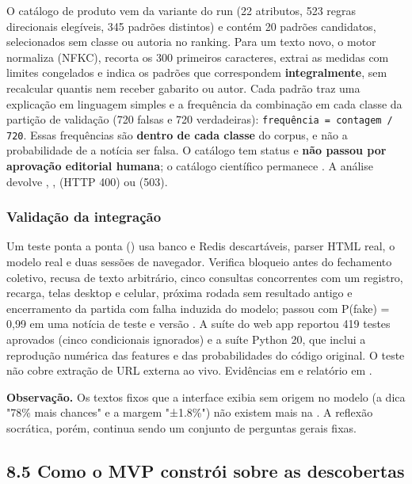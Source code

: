 \documentclass[
  brazilian,
  11pt,
]{article}
\begin{document}
O catálogo de produto vem da variante  do run  (22 atributos, 523 regras direcionais elegíveis, 345 padrões distintos) e contém 20 padrões candidatos, selecionados sem classe ou autoria no ranking. Para um texto novo, o motor normaliza (NFKC), recorta os 300 primeiros caracteres, extrai as medidas com limites congelados e indica os padrões que correspondem \textbf{integralmente}, sem recalcular quantis nem receber gabarito ou autor. Cada padrão traz uma explicação em linguagem simples e a frequência da combinação em cada classe da partição de validação (720 falsas e 720 verdadeiras): \texttt{frequência = contagem / 720}. Essas frequências são \textbf{dentro de cada classe} do corpus, e não a probabilidade de a notícia ser falsa. O catálogo tem status  e \textbf{não passou por aprovação editorial humana}; o catálogo científico permanece . A análise devolve , ,  (HTTP 400) ou  (503).

\subsubsection{Validação da integração}

Um teste ponta a ponta () usa banco e Redis descartáveis, parser HTML real, o modelo real e duas sessões de navegador. Verifica bloqueio antes do fechamento coletivo, recusa de texto arbitrário, cinco consultas concorrentes com um registro, recarga, telas desktop e celular, próxima rodada sem resultado antigo e encerramento da partida com falha induzida do modelo; passou com P(fake) = 0,99 em uma notícia de teste e versão . A suíte do web app reportou 419 testes aprovados (cinco condicionais ignorados) e a suíte Python 20, que inclui a reprodução numérica das features e das probabilidades do código original. O teste não cobre extração de URL externa ao vivo. Evidências em  e relatório em .

\textbf{Observação.} Os textos fixos que a interface exibia sem origem no modelo (a dica "78\% mais chances" e a margem "±1.8\%") não existem mais na . A reflexão socrática, porém, continua sendo um conjunto de perguntas gerais fixas.

\subsection{8.5 Como o MVP constrói sobre as descobertas}
\end{document}
